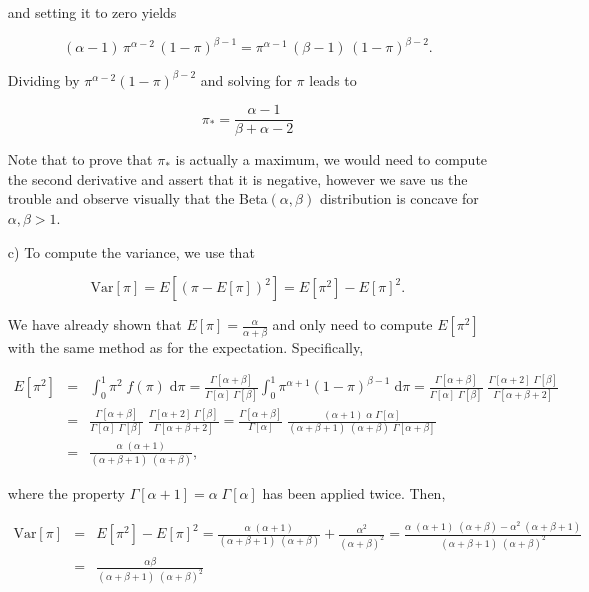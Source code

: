 \documentclass[fontsize=11pt,DIV=18,parskip=half]{scrartcl}
\begin{document}
\begin{enumerate}
and setting it to zero yields

\begin{equation*}
(\alpha-1)\,\pi^{\alpha-2}\,(1-\pi)^{\beta-1} = \pi^{\alpha-1} \, (\beta-1) \, (1-\pi)^{\beta-2}.
\end{equation*}

Dividing by $\pi^{\alpha-2} (1-\pi)^{\beta-2}$ and solving for $\pi$ leads to

\begin{equation*}
\pi_* = \frac{\alpha-1}{\beta+\alpha-2}
\end{equation*}

Note that to prove that $\pi_*$ is actually a maximum, we would need to compute the second derivative and assert that it is negative, however we save us the trouble and observe visually that the Beta$(\alpha,\beta)$ distribution is concave for $\alpha, \beta > 1$.

\item[c)] To compute the variance, we use that

\begin{equation*}
\text{Var}[\pi] = E[(\pi - E[\pi])^2] = E[\pi^2] - E[\pi]^2.
\end{equation*}

We have already shown that $E[\pi] = \frac{\alpha}{\alpha+\beta}$ and only need to compute $E[\pi^2]$ with the same method as for the expectation. Specifically,

\begin{eqnarray*}
E[\pi^2] &=& \int_0^1 \pi^2 \; f(\pi) \; \text{d}\pi = \frac{\Gamma[\alpha+\beta]}{\Gamma[\alpha]\; \Gamma[\beta]} \int_0^1 \pi^{\alpha+1} (1-\pi)^{\beta-1} \; \text{d}\pi = \frac{\Gamma[\alpha+\beta]}{\Gamma[\alpha]\; \Gamma[\beta]} \; \frac{\Gamma[\alpha+2]\; \Gamma[\beta]}{\Gamma[\alpha+\beta+2]} \\
&=& \frac{\Gamma[\alpha+\beta]}{\Gamma[\alpha]\; \Gamma[\beta]} \; \frac{\Gamma[\alpha+2]\; \Gamma[\beta]}{\Gamma[\alpha+\beta+2]} = \frac{\Gamma[\alpha+\beta]}{\Gamma[\alpha]} \; \frac{(\alpha+1) \; \alpha \; \Gamma[\alpha]}{(\alpha+\beta+1)\;(\alpha+\beta)\;\Gamma[\alpha+\beta]}\\
&=& \frac{\alpha \; (\alpha+1)}{(\alpha+\beta+1)\;(\alpha+\beta)},
\end{eqnarray*}

where the property $\Gamma[\alpha+1] = \alpha\;\Gamma[\alpha]$ has been applied twice. Then,

\begin{eqnarray*}
\text{Var}[\pi] &=& E[\pi^2] - E[\pi]^2 = \frac{\alpha \; (\alpha+1)}{(\alpha+\beta+1)\;(\alpha+\beta)} + \frac{\alpha^2}{(\alpha+\beta)^2} = \frac{\alpha\;(\alpha+1)\;(\alpha+\beta) -  \alpha^2\;(\alpha+\beta+1)}{(\alpha+\beta+1) \; (\alpha+\beta)^2}\\
&=& \frac{\alpha\beta}{(\alpha+\beta+1) \; (\alpha+\beta)^2}
\end{eqnarray*}
\end{enumerate}
\end{document}
